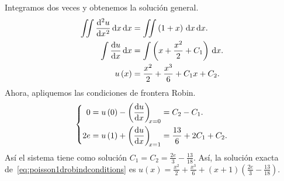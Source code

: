 \begin{solution}
      Integramos dos veces y obtenemos la solución general.
      \begin{align*}
            \iint
            \diff[2]{u}{x}
            \dl x
            \dl x           & =
            \iint
            \left(1+x\right)
            \dl x
            \dl x.              \\
            \int
            \diff{u}{x}
            \dl x           & =
            \int
            \left(x+\frac{x^{2}}{2}+C_{1}\right)
            \dl x.              \\
            u\left(x\right) & =
            \frac{x^{2}}{2}+\frac{x^{3}}{6}+C_{1}x+C_{2}.
      \end{align*}
      Ahora, apliquemos las condiciones de frontera Robin.
      \begin{equation}
            \left\{
            \begin{aligned}
                  0
                   & =
                  u\left(0\right)-
                  \diff{u}{x}[x=0]=
                  C_{2}-C_{1}. \\
                  2e
                   & =
                  u\left(1\right)+
                  \diff{u}{x}[x=1]=
                  \frac{13}{6}+2C_{1}+C_{2}.
            \end{aligned}
            \right.
      \end{equation}
      Así el sistema tiene como solución
      $C_{1}=C_{2}=\frac{2e}{3}-\frac{13}{18}$.
      Así, la solución exacta
      de~\eqref{eq:poisson1drobindconditions} es
      \begin{math}
            u\left(x\right)=
            \frac{x^{2}}{2}+\frac{x^{3}}{6}+
            \left(x+1\right)\left(\frac{2e}{3}-\frac{13}{18}\right)
      \end{math}.
      \noQED
\end{solution}

